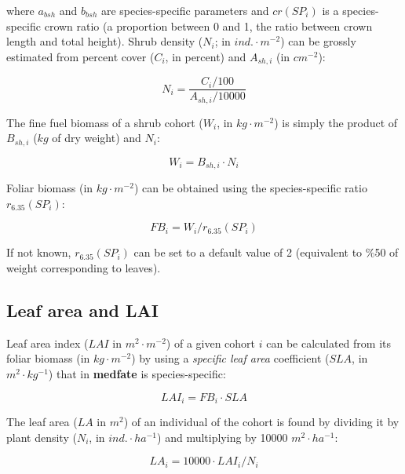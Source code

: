 \documentclass[]{book}
\begin{document}
where \(a_{bsh}\) and \(b_{bsh}\) are species-specific parameters and
\(cr(SP_i)\) is a species-specific crown ratio (a proportion between 0
and 1, the ratio between crown length and total height). Shrub density
(\(N_{i}\); in \(ind.\cdot m^{-2}\)) can be grossly estimated from
percent cover (\(C_{i}\), in percent) and \(A_{sh,i}\) (in \(cm^{-2}\)):

\begin{equation}
N_{i} = \frac{C_{i}/100}{A_{sh,i}/10000}
\end{equation}

The fine fuel biomass of a shrub cohort (\(W_{i}\), in
\(kg \cdot m^{-2}\)) is simply the product of \(B_{sh,i}\) (\(kg\) of
dry weight) and \(N_{i}\):

\begin{equation}
W_{i} =  B_{sh,i} \cdot N_{i}
\label{eq:shrubloading}
\end{equation}

Foliar biomass (in \(kg \cdot m^{-2}\)) can be obtained using the
species-specific ratio \(r_{6.35}(SP_i)\):

\begin{equation}
FB_{i} =  W_{i}/r_{6.35}(SP_i)
\label{eq:shrubfoliarbiomass}
\end{equation}

If not known, \(r_{6.35}(SP_i)\) can be set to a default value of 2
(equivalent to \%50 of weight corresponding to leaves).

\subsection{Leaf area and LAI}\label{leaf-area-and-lai}

Leaf area index (\(LAI\) in \(m^2 \cdot m^{-2}\)) of a given cohort
\(i\) can be calculated from its foliar biomass (in \(kg \cdot m^{-2}\))
by using a \emph{specific leaf area} coefficient (\(SLA\), in
\(m^2 \cdot kg^{-1}\)) that in \textbf{medfate} is species-specific:

\begin{equation}
LAI_{i} =  FB_{i} \cdot SLA
\end{equation}

The leaf area (\(LA\) in \(m^2\)) of an individual of the cohort is
found by dividing it by plant density (\(N_i\), in
\(ind.\cdot ha^{-1}\)) and multiplying by 10000 \(m^2 \cdot ha^{-1}\):

\begin{equation}
LA_{i} =  10000 \cdot LAI_{i} / N_{i}
\end{equation}
\end{document}
